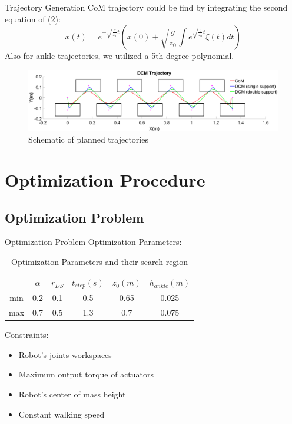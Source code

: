 \documentclass[aspectratio=169,t,xcolor=table]{beamer}
\begin{document}
\begin{frame}{Trajectory Generation}
    CoM trajectory could be find by integrating the second equation of (2):
    \begin{equation}
        x(t)=e^{-\sqrt{\frac{g}{z_0}}t}(x(0)+\sqrt{\frac{g}{z_0}}\int{e^{\sqrt{\frac{g}{z_0}}t}}\xi(t)dt)    \end{equation}
    Also for ankle trajectories, we utilized a 5th degree polynomial.
    \begin{figure}
        \centering
        \includegraphics[width = 1.1\textheight]{lib/logos/DCMTrajectory.png}
        \caption{Schematic of planned trajectories}
    \end{figure}
\end{frame}

\section{Optimization Procedure}

\subsection{Optimization Problem}
\begin{frame}{Optimization Problem}
Optimization Parameters:
\begin{table}
\centering
\caption{Optimization Parameters and their search region}
\begin{tabular}{cccccc} 
\hline
    & $\alpha$ & $r_{DS}$ & $t_{step}(s)$ & $z_0(m)$ & $h_{ankle}(m)$  \\ 
\hline
min & 0.2      & 0.1      & 0.5           & 0.65     & 0.025           \\
max & 0.7      & 0.5      & 1.3           & 0.7      & 0.075           \\
\hline
\end{tabular}
\end{table}
Constraints:
	\begin{itemize}
        \item Robot's joints workspaces
        \item Maximum output torque of actuators
        \item Robot's center of mass height
        \item Constant walking speed
    \end{itemize}
\end{frame}
\end{document}
